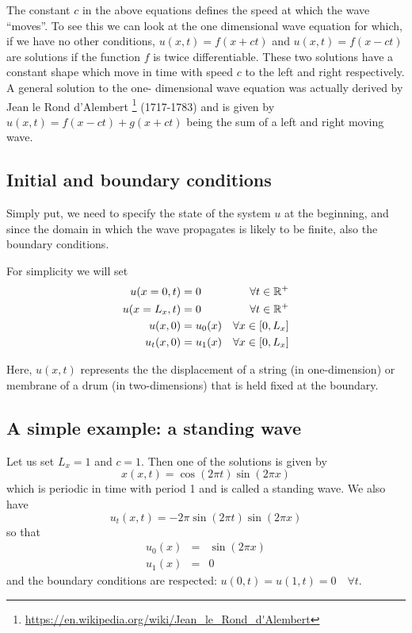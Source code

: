 The constant $c$ in the above equations defines the speed at which the wave ``moves''. 
To see this we can look at the one dimensional wave equation for which, if we have no 
other conditions, $u(x,t)=f(x+ct)$ and $u(x,t)=f(x-ct)$ are solutions if the function 
$f$ is twice differentiable. These two solutions have a constant shape which move in 
time with speed $c$ to the left and right respectively. A general solution to the one-
dimensional wave equation was actually derived by Jean le Rond d’Alembert \footnote{\url{https://en.wikipedia.org/wiki/Jean_le_Rond_d'Alembert}} (1717-1783) and is given 
by $u(x,t)=f(x-ct)+g(x+ct)$ being the sum of a left and right moving wave.




\subsection{Initial and boundary conditions}

Simply put, we need to specify the state of the system $u$ at the beginning, 
and since the domain in which the wave propagates is likely to be finite, 
also the boundary conditions.

For simplicity we will set
\begin{align}
u(x=0,t) & = 0 & \forall t\in {\mathbb{R}}^+  \nonumber\\
u(x=L_x,t) & = 0 & \forall t\in {\mathbb{R}}^+ \nonumber\\
u(x,0) &= u_0(x) & \forall x\in[0,L_x] \nonumber\\
u_t(x,0) &= u_1(x) & \forall x\in[0,L_x] \label{eq:fdm-wave-0}
\end{align}

Here, $u(x,t)$ represents the the displacement of a string (in one-dimension) or membrane of a drum (in
two-dimensions) that is held fixed at the boundary.


\subsection{A simple example: a standing wave \label{ss:sw1d}}

Let us set $L_x=1$ and $c=1$. Then one of the solutions is 
given by 
\[
x(x,t)=\cos(2\pi t) \sin(2\pi x)
\]
which is periodic in time with period 1 and is called a standing wave.
We also have
\[
u_t(x,t)=-2 \pi \sin (2\pi t) \sin(2\pi x)
\]
so that 
\begin{eqnarray}
u_0(x) &=& \sin(2\pi x) \\
u_1(x) &=& 0 
\end{eqnarray}
and the boundary conditions are respected: $u(0,t)=u(1,t)=0 \quad \forall t$.

